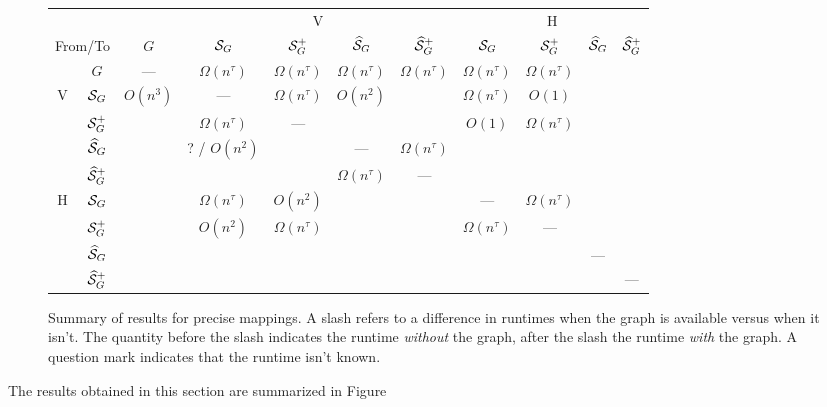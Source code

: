 \begin{figure}
	\centering
	\renewcommand{\arraystretch}{1.5}	\begin{tabular}{|c|c|c|c|c|c|c|c|c|c|c|}
		\hline 
		\multicolumn{3}{|c|}{} & \multicolumn{4}{c|}{\textsf{V}} & \multicolumn{4}{c|}{\textsf{H}}\\
	\cline{3-11} 
\multicolumn{2}{|r|}{From/To} & $G$ & $\mathcal{S}_G$ & $\mathcal{S}_G^+$ & $\widehat{\mathcal{S}}_G$ & $\widehat{\mathcal{S}}_G^+$ & $\mathcal{S}_G$ & $\mathcal{S}_G^+$ & $\widehat{\mathcal{S}}_G$ & $\widehat{\mathcal{S}}_G^+$ \\
\cline{2-11} 
& $G$ & --- &$\Omega(n^\tau)$ &$\Omega(n^\tau)$ &$\Omega(n^\tau)$ &$\Omega(n^\tau)$ & $\Omega(n^\tau)$ & $\Omega(n^\tau)$ &  & \\
\hline 
\multirow{4}{0.4cm}{\textsf{V}} & $\mathcal{S}_G$ & $O(n^3)$ & --- & $\Omega(n^\tau)$ & $O(n^2)$ & & $\Omega(n^\tau)$ & $O(1)$ & & \\
\cline{2-11}
& $\mathcal{S}_G^+$ & & $\Omega(n^\tau)$ & --- & & & $O(1)$ &$\Omega(n^\tau)$ & & \\
\cline{2-11}
& $\widehat{\mathcal{S}}_G$ & & ?  / $O(n^2)$ &  & --- & $\Omega(n^\tau)$ & & & &\\
\cline{2-11}
& $\widehat{\mathcal{S}}_G^+$ & & & &$\Omega(n^\tau)$ & --- & & & & \\
\hline 
\multirow{4}{0.4cm}{\textsf{H}} & $\mathcal{S}_G$ & & $\Omega(n^\tau)$ & $O(n^2)$ & & &--- & $\Omega(n^\tau)$& & \\
\cline{2-11}
& $\mathcal{S}_G^+$ & & $O(n^2)$ & $\Omega(n^\tau)$ & & &$\Omega(n^\tau)$ & --- & & \\
\cline{2-11}
& $\widehat{\mathcal{S}}_G$ & & & & &  & & & --- &\\
\cline{2-11}
& $\widehat{\mathcal{S}}_G^+$ & & & & & & & & & --- \\
\hline 
	\end{tabular}
	\renewcommand{\arraystretch}{1}
\caption{Summary of results for precise mappings. A slash refers to a difference in runtimes when the graph is available versus when it isn't. The quantity before the slash indicates the runtime \emph{without} the graph, after the slash the runtime \emph{with} the graph. A question mark indicates that the runtime isn't known.}
\end{figure}

The results obtained in this section are summarized in Figure 

